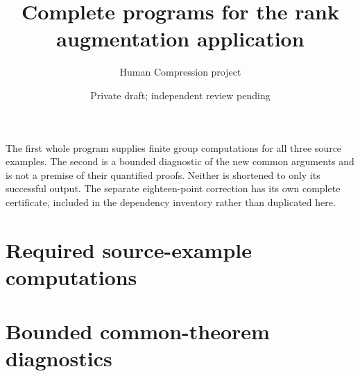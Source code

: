 \documentclass[a4paper,10pt]{article}
\title{Complete programs for the rank augmentation application}
\author{Human Compression project}\date{Private draft; independent review pending}
\begin{document}
\maketitle
The first whole program supplies finite group computations for all three
source examples. The second is a bounded diagnostic of the new common
arguments and is not a premise of their quantified proofs. Neither is
shortened to only its successful output. The separate eighteen-point
correction has its own complete certificate, included in the dependency
inventory rather than duplicated here.
\section*{Required source-example computations}
\section*{Bounded common-theorem diagnostics}
\end{document}
